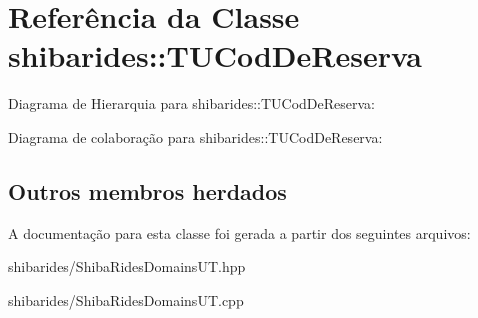 \hypertarget{classshibarides_1_1TUCodDeReserva}{}\section{Referência da Classe shibarides\+:\+:T\+U\+Cod\+De\+Reserva}
\label{classshibarides_1_1TUCodDeReserva}


Diagrama de Hierarquia para shibarides\+:\+:T\+U\+Cod\+De\+Reserva\+:


Diagrama de colaboração para shibarides\+:\+:T\+U\+Cod\+De\+Reserva\+:
\subsection*{Outros membros herdados}


A documentação para esta classe foi gerada a partir dos seguintes arquivos\+:\begin{DoxyCompactItemize}
\item 
shibarides/Shiba\+Rides\+Domains\+U\+T.\+hpp\item 
shibarides/Shiba\+Rides\+Domains\+U\+T.\+cpp\end{DoxyCompactItemize}
